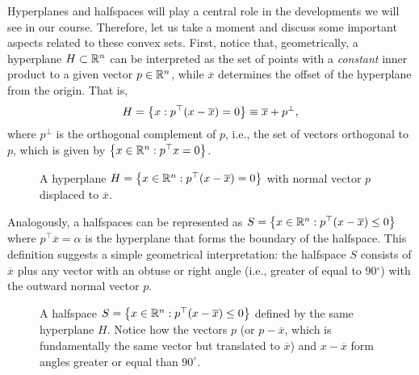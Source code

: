 Hyperplanes and halfspaces will play a central role in the developments we will see in our course. Therefore, let us take a moment and discuss some important aspects related to these convex sets. First, notice that, geometrically, a hyperplane $H \subset \mathbb{R}^n$ can be interpreted as the set of points with a \emph{constant} inner product to a given vector $p \in \mathbb{R}^n$, while $\overline{x}$ determines the offset of the hyperplane from the origin. That is,
	\begin{equation*}
		H = \left\{ x : p^\top(x - \overline{x}) = 0 \right \} \equiv \overline{x} + p^{\perp},
	\end{equation*}
	where $p^\perp$ is the orthogonal complement of $p$, i.e., the set of vectors orthogonal to $p$, which is given by $\left\{ x \in \mathbb{R}^n : p^\top x = 0 \right \}$.
	
	\begin{figure}[H]
		\caption{A hyperplane $H = \left\{ x \in \mathbb{R}^n: p^\top(x - \overline{x}) = 0 \right \}$ with normal vector $p$ displaced to $\overline{x}$.}
	\end{figure}
	
	Analogously, a halfspaces can be represented as $S = \left\{ x \in \mathbb{R}^n : p^\top(x - \overline{x}) \le 0 \right \}$ where $p^\top \overline{x} = \alpha$ is the hyperplane that forms the boundary of the halfspace. This definition suggests a simple geometrical interpretation: the halfspace $S$ consists of $\overline{x}$ plus any vector with an obtuse or right angle (i.e., greater of equal to 90$^\circ$) with the outward normal vector $p$.
 
 	\begin{figure}[H]
		\caption{A halfspace $S = \left\{ x \in \mathbb{R}^n : p^\top(x - \overline{x}) \le 0 \right \}$ defined by the same hyperplane $H$. Notice how the vectors $p$ (or $p - \overline{x}$, which is fundamentally the same vector but translated to $\overline{x}$) and $x - \overline{x}$ form angles greater or equal than $90^\circ$.}
	\end{figure}
	
